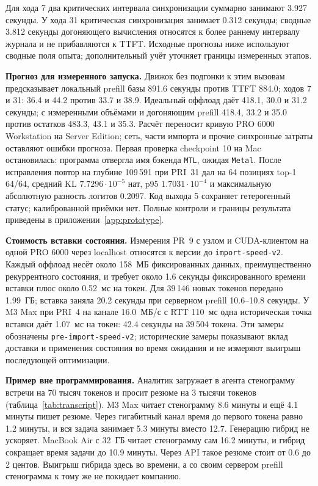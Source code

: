 Для хода 7 два критических интервала синхронизации суммарно занимают 3.927 секунды.
У хода 31 критическая синхронизация занимает 0.312 секунды; сводные 3.812 секунды догоняющего вычисления
относятся к более раннему интервалу журнала и не прибавляются к TTFT.
Исходные прогнозы ниже используют сводные поля опыта; дополнительный учёт уточняет границы измеренных этапов.

\textbf{Прогноз для измеренного запуска.} Движок без подгонки к этим вызовам предсказывает
локальный prefill базы 891.6 секунды против TTFT 884.0; ходов 7 и 31: 36.4 и 44.2 против 33.7 и 38.9.
Идеальный оффлоад даёт 418.1, 30.0 и 31.2 секунды; с измеренными объёмами и догоняющим prefill
418.4, 33.2 и 35.0 против остатков 483.3, 43.1 и 35.3. Расчёт переносит кривую PRO 6000
Workstation на Server Edition; сеть, части импорта и прочие синхронные затраты оставляют
ошибки прогноза. Первая проверка checkpoint 10 на Mac остановилась: программа отвергла имя
бэкенда \texttt{MTL}, ожидая \texttt{Metal}. После исправления повтор на глубине 109\,591 при PRI~31 дал
на 64 позициях top-1 64/64, средний KL $7.7296\cdot10^{-5}$ нат, p95 $1.7031\cdot10^{-4}$ и максимальную
абсолютную разность логитов 0.2097. Код выхода 5 сохраняет гетерогенный статус; калиброванной приёмки нет.
Полные контроли и границы результата приведены в приложении~\ref{app:prototype}.

\textbf{Стоимость вставки состояния.} Измерения PR~9 с узлом и CUDA-клиентом на одной PRO 6000
через localhost относятся к версии до \texttt{import-speed-v2}.
Каждый оффлоад несёт около 158~МБ фиксированных данных, преимущественно рекуррентного состояния,
и требует около 1.6 секунды фиксированного времени вставки плюс около 0.52~мс на токен.
Для 39\,146 новых токенов передано 1.99~ГБ; вставка заняла 20.2 секунды при серверном prefill
10.6--10.8 секунды. У M3 Max при PRI~4 на канале 16.0~МБ/с с RTT 110~мс одна историческая точка вставки даёт 1.07~мс на токен:
42.4 секунды на 39\,504 токена. Эти замеры обозначены \texttt{pre-import-speed-v2};
исторические замеры показывают вклад доставки и применения состояния во время ожидания
и не измеряют выигрыш последующей оптимизации.

\textbf{Пример вне программирования.} Аналитик загружает в агента стенограмму встречи на 70 тысяч токенов и просит
резюме на 3 тысячи токенов (таблица~\ref{tab:transcript}). M3 Max читает стенограмму 8.6 минуты и ещё 4.1 минуты
пишет резюме. Через гигабитный канал время до первого токена равно 1.2 минуты, и вся задача занимает 5.3 минуты
вместо 12.7. Генерацию гибрид не ускоряет. MacBook Air с 32~ГБ читает стенограмму сам
16.2 минуты, и гибрид сокращает время задачи до 10.9 минуты. Через API такое резюме стоит от 0.6 до 2 центов. Выигрыш гибрида
здесь во времени, а со своим сервером prefill стенограмма к тому же не покидает компанию.

